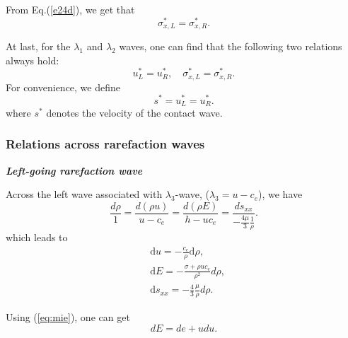 \documentclass{article}
\numberwithin{equation}{section}
\numberwithin{table}{section}
\begin{document}

From  Eq.(\ref{e24d}), we  get that
\begin{equation}   \label{e27a}
\sigma_{x,L} ^{\ast}=  \sigma_{x,R} ^{\ast}.
\end{equation}


At last, for the $\lambda_{1}$ and $\lambda_{2}$ waves, one can find
that the following two relations always hold:
\begin{equation}   \label{e28}
u_{L}^{\ast}=u_{R}^{\ast}, \quad
\sigma_{x,L}^{\ast}=\sigma_{x,R}^{\ast}.
\end{equation}
For convenience, we define
\begin{equation}\label{eq:contact}
  s^* = u_L^* = u_R^*. %
\end{equation}
where $s^*$ denotes the velocity of the contact wave.

\subsubsection{Relations across rarefaction waves}\label{sec:rarefaction}

\emph{\textbf{Left-going rarefaction wave} }

Across the left wave associated with $\lambda_3$-wave, ($\lambda_3=u-c_e$), we have
\begin{equation}
  \frac{d\rho}{1} = \frac{d(\rho u)}{u-c_e} = \frac{d(\rho E)}{h-uc_e} = \frac{ds_{xx}}{-\frac{4\mu}{3}\frac{1}{\rho}}.
\end{equation}
which leads to
\begin{align}
  \label{eq:urho}
  & \text{d} u =-\frac{c_e}{\rho}\text{d}\rho,\\
 \label{eq:Erho}
  & \text{d} E = -\frac{\sigma+\rho u c_e}{\rho^2} d\rho,\\
\label{eq:sxxrho}
& \text{d} s_{xx} = -\frac{4}{3}\frac{\mu}{\rho} d\rho.
\end{align}

Using (\ref{eq:mie}), one can get
\begin{equation}\label{te2}
  dE=de+udu.
\end{equation}
\end{document}
